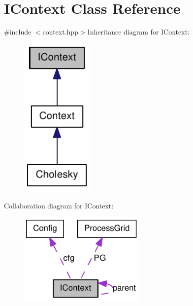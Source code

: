 \hypertarget{class_i_context}{
\section{IContext Class Reference}
\label{class_i_context}
}


{\ttfamily \#include $<$context.hpp$>$}Inheritance diagram for IContext:\nopagebreak
\begin{figure}[H]
\begin{center}
\leavevmode
\includegraphics[width=102pt]{class_i_context__inherit__graph}
\end{center}
\end{figure}
Collaboration diagram for IContext:\nopagebreak
\begin{figure}[H]
\begin{center}
\leavevmode
\includegraphics[width=176pt]{class_i_context__coll__graph}
\end{center}
\end{figure}
